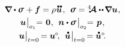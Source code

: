

\thispagestyle{empty}

\label{chapter:vibrationsnwaves}



\label{para:vibrations.3dbodies}

   

\nopagebreak\vspace{-0.1em}\begin{equation}\label{classiclinearelasticity:problem}
\begin{array}{c}
\boldnabla \dotp \linearstress \hspace{.15ex} + \bm{f} = \rho \hspace{.1ex} \mathdotdotabove{\bm{u}} \hspace{.2ex} ,
\:\:
\linearstress = \stiffnesstensor \dotdotp \hspace{-0.25ex} \boldnabla {\bm{u}} \hspace{.1ex} ,
\\[.32em]
%
\bm{u} \hspace{.1ex} \bigr|_{o_1} \hspace{-0.64ex} = \hspace{.2ex} \bm{0} \hspace{.1ex},
\:\:
\bm{n} \dotp \linearstress \hspace{0.25ex} \bigr|_{o_2} \hspace{-0.64ex} = \hspace{.2ex} \bm{p} \hspace{.16ex} ,
\\[.4em]
%
\bm{u} \hspace{.1ex} \bigr|_{t=0} \hspace{-0.2ex} = \bm{u}^{\hspace{-0.1ex}\circ} \hspace{-0.4ex},
\:\:
\mathdotabove{\bm{u}} \hspace{.1ex} \bigr|_{t=0} \hspace{-0.2ex} = \mathdotabove{\bm{u}}^{\circ} \hspace{-0.4ex} .
\end{array}
\end{equation}

